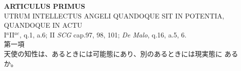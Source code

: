 \documentclass[paper=a4paper,fontsize=10pt,jafontsize=9pt,titlepage]{jlreq}
\begin{document}
\newpage

\newpage
{}
{}
\setcounter{section}{1}
\setcounter{subsection}{0}
\begin{center}
 {\Large {\bfseries ARTICULUS PRIMUS}}\\
 {\large UTRUM INTELLECTUS ANGELI QUANDOQUE SIT IN POTENTIA, QUANDOQUE
 IN ACTU}\\
 {\footnotesize I$^a$II$^{ae}$, q.1, a.6; II {\itshape SCG} cap.97, 98,
 101; {\itshape De Malo}, q.16, a.5, 6.}\\
 {\Large 第一項\\天使の知性は、あるときには可能態にあり、別のあるときには現実態に
	あるか。}
\end{center}
\end{document}
